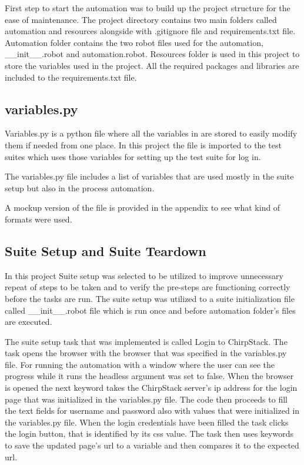 First step to start the automation was to build up the project structure for the ease of maintenance.
The project directory contains two main folders called automation and resources alongside with .gitignore file and requirements.txt file.
Automation folder contains the two robot files used for the automation, \_\_init\_\_.robot and automation.robot.
Resources folder is used in this project to store the variables used in the project.
All the required packages and libraries are included to the requirements.txt file.

\subsection{variables.py}
Variables.py is a python file where all the variables in are stored to easily modify them if needed from one place.
In this project the file is imported to the test suites which uses those variables for setting up the test suite for log in.

The variables.py file includes a list of variables that are used mostly in the suite setup but also in the process automation.

A mockup version of the file is provided in the appendix to see what kind of formats were used.

\subsection{Suite Setup and Suite Teardown}
In this project Suite setup was selected to be utilized to improve unnecessary repeat of steps to be taken and to verify the pre-steps are functioning correctly before the tasks are run.
The suite setup was utilized to a suite initialization file called \_\_init\_\_.robot file which is run once and before automation folder's files are executed.

The suite setup task that was implemented is called Login to ChirpStack.
The task opens the browser with the browser that was specified in the variables.py file.
For running the automation with a window where the user can see the progress while it runs the headless argument was set to false.
When the browser is opened the next keyword takes the ChirpStack server's \gls{ip} address for the login page that was initialized in the variables.py file.
The code then proceeds to fill the text fields for username and password also with values that were initialized in the variables.py file.
When the login credentials have been filled the task clicks the login button, that is identified by its css value.
The task then uses keywords to save the updated page's \gls{url} to a variable and then compares it to the expected \gls{url}.

